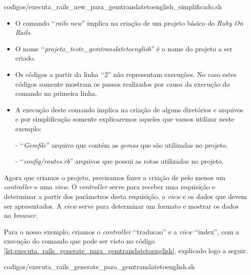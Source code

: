 
{codigos/executa_rails_new_para_gemtranslatetoenglish_simplificado.sh}

\begin{itemize}

 \item O comando ‘‘\emph{rails new}'' implica na criação de um projeto básico do \emph{Ruby On Rails}.

 \item O nome ‘‘\emph{projeto\_teste\_gemtranslatetoenglish}'' é o nome do projeto a ser criado.

  \item Os códigos a partir da linha ‘‘2'' não representam execuções. No caso estes códigos somente
 mostram os passos realizados por causa da execução do comando na primeira linha.

 \item A execução deste comando implica na criação de alguns diretórios e arquivos e por simplificação
 somente explicaremos aqueles que vamos utilizar neste exemplo:

  \subitem - ‘‘\emph{Gemfile}'' arquivo que contém as \emph{gemas} que são utilizadas no projeto.

  \subitem - ‘‘\emph{config/routes.rb}'' arquivos que possui as rotas utilizadas no projeto.

\end{itemize}

Agora que criamos o projeto, precisamos fazer a criação de pelo menos um \emph{controller} e uma \emph{view}.
O \emph{controller} serve para receber uma requisição e determinar a partir dos parâmetros desta
requisição, a \emph{view} e os dados que devem ser apresentados. A \emph{view} serve para
determinar um formato e mostrar os dados no \emph{browser}.

Para o nosso exemplo, criamos o \emph{controller} ‘‘traducao'' e a \emph{view} ‘‘index'', com a execução do
comando que pode ser visto no código \ref{lst:executa_rails_generate_para_gemtranslatetoenglish},
explicado logo a seguir.


{codigos/executa_rails_generate_para_gemtranslatetoenglish.sh}


